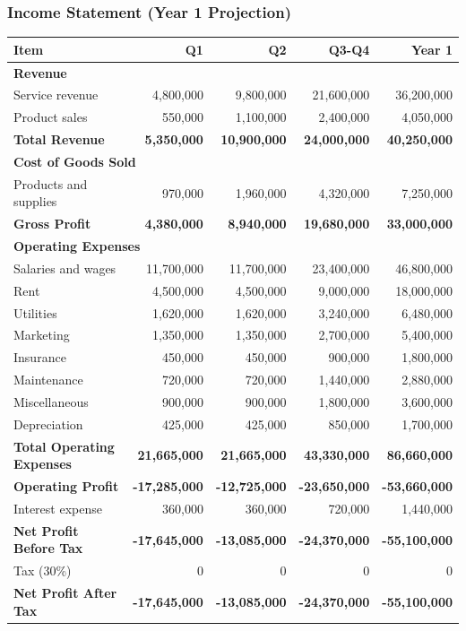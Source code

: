 \documentclass[a4paper,12pt]{article}
\begin{document}
\vspace{1em}

\subsubsection{Income Statement (Year 1 Projection)}

\begin{tabular}{|l|r|r|r|r|}
\hline
\textbf{Item} & \textbf{Q1} & \textbf{Q2} & \textbf{Q3-Q4} & \textbf{Year 1} \\
\hline
\multicolumn{5}{|l|}{\textbf{Revenue}} \\
Service revenue & 4,800,000 & 9,800,000 & 21,600,000 & 36,200,000 \\
Product sales & 550,000 & 1,100,000 & 2,400,000 & 4,050,000 \\
\hline
\textbf{Total Revenue} & \textbf{5,350,000} & \textbf{10,900,000} & \textbf{24,000,000} & \textbf{40,250,000} \\
\hline
\multicolumn{5}{|l|}{\textbf{Cost of Goods Sold}} \\
Products and supplies & 970,000 & 1,960,000 & 4,320,000 & 7,250,000 \\
\hline
\textbf{Gross Profit} & \textbf{4,380,000} & \textbf{8,940,000} & \textbf{19,680,000} & \textbf{33,000,000} \\
\hline
\multicolumn{5}{|l|}{\textbf{Operating Expenses}} \\
Salaries and wages & 11,700,000 & 11,700,000 & 23,400,000 & 46,800,000 \\
Rent & 4,500,000 & 4,500,000 & 9,000,000 & 18,000,000 \\
Utilities & 1,620,000 & 1,620,000 & 3,240,000 & 6,480,000 \\
Marketing & 1,350,000 & 1,350,000 & 2,700,000 & 5,400,000 \\
Insurance & 450,000 & 450,000 & 900,000 & 1,800,000 \\
Maintenance & 720,000 & 720,000 & 1,440,000 & 2,880,000 \\
Miscellaneous & 900,000 & 900,000 & 1,800,000 & 3,600,000 \\
Depreciation & 425,000 & 425,000 & 850,000 & 1,700,000 \\
\hline
\textbf{Total Operating Expenses} & \textbf{21,665,000} & \textbf{21,665,000} & \textbf{43,330,000} & \textbf{86,660,000} \\
\hline
\textbf{Operating Profit} & \textbf{-17,285,000} & \textbf{-12,725,000} & \textbf{-23,650,000} & \textbf{-53,660,000} \\
\hline
Interest expense & 360,000 & 360,000 & 720,000 & 1,440,000 \\
\hline
\textbf{Net Profit Before Tax} & \textbf{-17,645,000} & \textbf{-13,085,000} & \textbf{-24,370,000} & \textbf{-55,100,000} \\
\hline
Tax (30\%) & 0 & 0 & 0 & 0 \\
\hline
\textbf{Net Profit After Tax} & \textbf{-17,645,000} & \textbf{-13,085,000} & \textbf{-24,370,000} & \textbf{-55,100,000} \\
\hline
\end{tabular}
\end{document}
